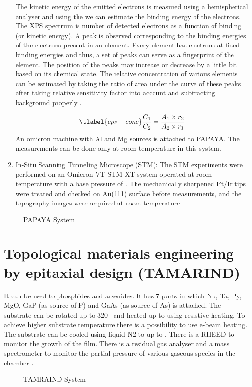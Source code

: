\begin{enumerate}
    The kinetic energy of the emitted electrons is measured using a 
    hemispherical analyser and using the  we can estimate the 
    binding energy of the electrons. The XPS spectrum is number of detected 
    electrons as a function of binding (or kinetic energy). A peak is observed 
    corresponding to the binding energies of the electrons present in an 
    element. Every element has electrons at fixed binding energies and thus, 
    a set of peaks can serve as a fingerprint of the element. The position of 
    the peaks may increase or decrease by a little bit based on its chemical 
    state. The relative concentration of various elements can be estimated by 
    taking the ratio of area under the curve of these peaks after taking 
    relative sensitivity factor into account and subtracting background 
    properly \cite{Seah1980}.

    \begin{equation}
        \tlabel{cps-conc}
        \frac{C_1}{C_2} = \frac{A_1 \times r_2}{A_2 \times r_1}
    \end{equation}
    An omicron machine with Al and Mg sources is attached to PAPAYA. 
    The measurements can be done only at room temperature in this system.
    
    \item In-Situ Scanning Tunneling Microscope (STM): The STM experiments 
    were performed on an Omicron VT-STM-XT system operated at room temperature 
    with a base pressure of . The mechanically sharpened 
    Pt/Ir tips were treated and checked on Au(111) surface before measurements, 
    and the topography images were acquired at room-temperature \cite{Warren1941}.
\end{enumerate}

\begin{figure}
    \caption{
        PAPAYA System
    }
\end{figure}


\section{Topological materials engineering by epitaxial design (TAMARIND)}
It can be used to phosphides and arsenides. It has 7 ports in which Nb, Ta, 
Py, MgO, GaP (as source of P) and GaAs (as source of As) is attached. 
The substrate can be rotated up to 320 \degree\ and heated up to  using 
resistive heating. To achieve higher substrate temperature there is a 
possibility to use e-beam heating. The substrate can be cooled using liquid 
N2 to up to . There is a RHEED to monitor the growth of the film. There is a 
residual gas analyser and a mass spectrometer to monitor the partial pressure of various 
gaseous species in the chamber \cite{Ohring2001}. 

\begin{figure}
    \caption{
        TAMRAIND System
    }
\end{figure}
